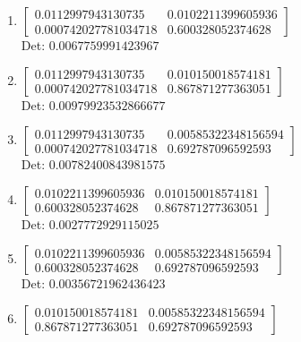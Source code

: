 \documentclass[12pt]{article}
\begin{document}
\begin{enumerate}

\item $\displaystyle \left[\begin{matrix}0.0112997943130735 & 0.0102211399605936\\0.000742027781034718 & 0.600328052374628\end{matrix}\right]$\\

Det: $0.0067759991423967$\\

\item $\displaystyle \left[\begin{matrix}0.0112997943130735 & 0.010150018574181\\0.000742027781034718 & 0.867871277363051\end{matrix}\right]$\\

Det: $0.00979923532866677$\\

\item $\displaystyle \left[\begin{matrix}0.0112997943130735 & 0.00585322348156594\\0.000742027781034718 & 0.692787096592593\end{matrix}\right]$\\

Det: $0.00782400843981575$\\

\item $\displaystyle \left[\begin{matrix}0.0102211399605936 & 0.010150018574181\\0.600328052374628 & 0.867871277363051\end{matrix}\right]$\\

Det: $0.0027772929115025$\\

\item $\displaystyle \left[\begin{matrix}0.0102211399605936 & 0.00585322348156594\\0.600328052374628 & 0.692787096592593\end{matrix}\right]$\\

Det: $0.00356721962436423$\\

\item $\displaystyle \left[\begin{matrix}0.010150018574181 & 0.00585322348156594\\0.867871277363051 & 0.692787096592593\end{matrix}\right]$\\


\end{enumerate}
\end{document}
